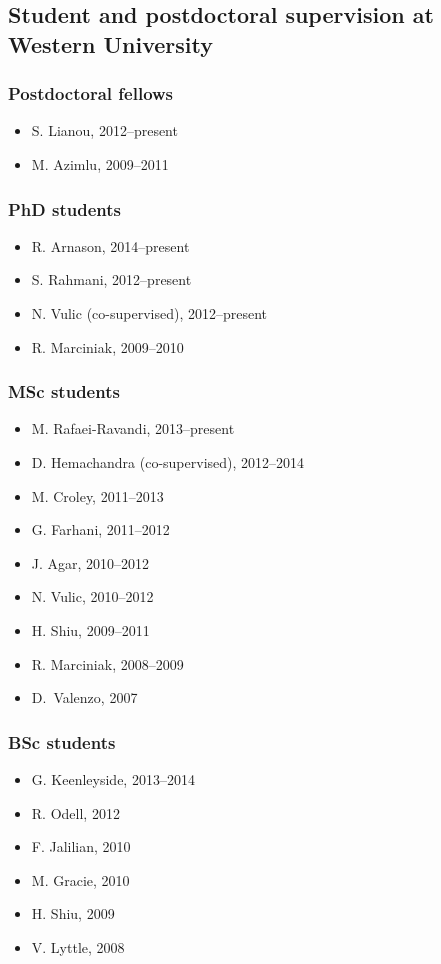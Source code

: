 \documentclass[12pt]{article}
\begin{document}

\vspace{0.5cm}
\subsection{Student and postdoctoral supervision at Western University}

\subsubsection{Postdoctoral fellows}
\begin{itemize}
\item S. Lianou, 2012--present
\item  M. Azimlu, 2009--2011
\end{itemize}

\subsubsection{PhD students}
\begin{itemize}
\item R. Arnason, 2014--present
\item S. Rahmani, 2012--present
\item N. Vulic (co-supervised), 2012--present
\item R. Marciniak, 2009--2010
\end{itemize}

\subsubsection{MSc students}
\begin{itemize}
\item M. Rafaei-Ravandi, 2013--present
\item D. Hemachandra (co-supervised), 2012--2014
\item M. Croley, 2011--2013
\item G. Farhani, 2011--2012
 \item J. Agar, 2010--2012
\item N. Vulic, 2010--2012
\item H. Shiu, 2009--2011
\item R. Marciniak, 2008--2009
\item D.\ Valenzo, 2007
\end{itemize}

\subsubsection{BSc students}
\begin{itemize}
\item G. Keenleyside, 2013--2014
\item R. Odell, 2012
\item F. Jalilian, 2010
\item M. Gracie, 2010
\item H. Shiu, 2009
\item V. Lyttle, 2008
\end{itemize}
\end{document}
